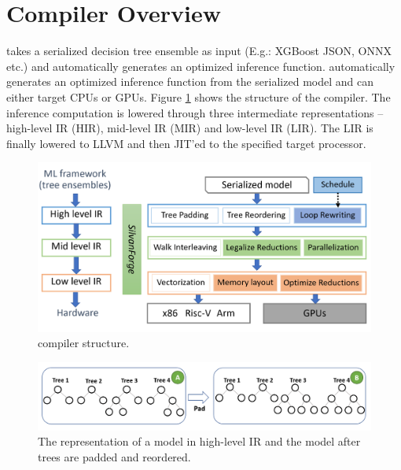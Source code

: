 \section{Compiler Overview}
\label{Sec:Overview}
\Treebeard{} takes a serialized decision tree ensemble as input (E.g.:
XGBoost JSON, ONNX etc.) and automatically generates an optimized inference function. 
\Treebeard{} automatically generates an optimized inference function from 
the serialized model and can either target CPUs or GPUs. 
Figure \ref{Fig:CompilerStructure} shows the structure of the \Treebeard{} compiler. 
The inference computation is lowered through three intermediate representations
-- high-level IR (HIR), mid-level IR (MIR) and low-level IR (LIR). The LIR is
finally lowered to LLVM and then JIT'ed to the specified target processor.

\begin{figure}[htb]
  \centering
  \includegraphics[width=\linewidth]{figures/compiler.png}
  \caption{\Treebeard{} compiler structure.}
  \label{Fig:CompilerStructure}
\end{figure}

\begin{figure}[htb]
  \centering
  \includegraphics[width=\linewidth]{figures/HIR.PNG}
  \caption{The representation of a model in high-level IR and the model 
  after trees are padded and reordered. }
  \label{Fig:HIRExample}
\end{figure}

